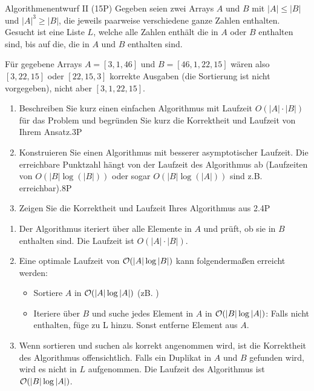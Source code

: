 \documentclass{article}
\begin{document}
\begin{exercise}{Algorithmenentwurf II (15P)}
  Gegeben seien zwei Arrays $A$ und $B$ mit $|A| \leq |B|$ und $|A|^3 \geq |B|$, die jeweils paarweise verschiedene ganze Zahlen enthalten. Gesucht ist eine Liste $L$, welche alle Zahlen enthält die in $A$ oder $B$ enthalten sind, bis auf die, die in $A$ und $B$ enthalten sind.\par
  Für gegebene Arrays $A = [3,1,46]$ und $B = [46,1,22,15]$ wären also $[3,22,15]$ oder $[22, 15, 3]$ korrekte Ausgaben (die Sortierung ist nicht vorgegeben), nicht aber $[3, 1, 22, 15]$.
  \begin{enumerate}
    \item Beschreiben Sie kurz einen einfachen Algorithmus mit Laufzeit $O(|A| \cdot |B|)$ für das Problem und begründen Sie kurz die Korrektheit und Laufzeit von Ihrem Ansatz.\hfill 3P
    \item Konstruieren Sie einen Algorithmus mit besserer asymptotischer Laufzeit. Die erreichbare Punktzahl hängt von der Laufzeit des Algorithmus ab (Laufzeiten von $O(|B| \log(|B|))$ oder sogar $O(|B| \log(|A|))$ sind z.B. erreichbar).\hfill 8P
    \item Zeigen Sie die Korrektheit und Laufzeit Ihres Algorithmus aus 2.\hfill 4P
  \end{enumerate}
  \begin{solution}
    \begin{enumerate}
      \item Der Algorithmus iteriert über alle Elemente in $A$ und prüft, ob sie in $B$ enthalten sind. Die Laufzeit ist $O(|A| \cdot |B|)$.
      \item Eine optimale Laufzeit von $\mathcal{O}(|A| \log |B|)$ kann folgendermaßen erreicht werden:
            \begin{itemize}
              \item Sortiere $A$ in $\mathcal{O}(|A| \log |A|)$ (zB. )
              \item Iteriere über $B$ und suche jedes Element in $A$ in $\mathcal{O}(|B| \log |A|)$: Falls nicht enthalten, füge zu L hinzu. Sonst entferne Element aus $A$.
            \end{itemize}
      \item Wenn sortieren und suchen als korrekt angenommen wird, ist die Korrektheit des Algorithmus offensichtlich. Falls ein Duplikat in $A$ und $B$ gefunden wird, wird es nicht in $L$ aufgenommen. Die Laufzeit des Algorithmus ist $\mathcal{O}(|B| \log |A|)$.
    \end{enumerate}
  \end{solution}
\end{exercise}
\end{document}
